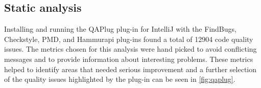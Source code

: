 \subsection{Static analysis}
Installing and running the QAPlug plug-in for IntelliJ with the FindBugs, Checkstyle, PMD, and Hammurapi plug-ins found a total of \num{12904} code quality issues. The metrics chosen for this analysis were hand picked to avoid conflicting messages and to provide information about interesting problems.
These metrics helped to identify areas that needed serious improvement and a further selection of the quality issues highlighted by the plug-in can be seen in \cref{fig:qaplug}. 

